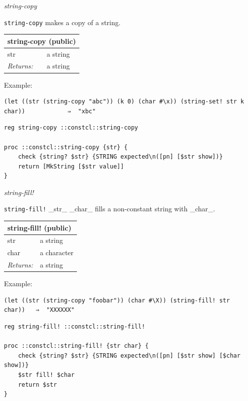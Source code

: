 \documentclass[twoside,9pt]{report}
\begin{document}
\emph{string-copy}


\texttt{string-copy} makes a copy of a string.

\begin{tabular}{ |l l| }
\hline
\multicolumn{2}{|l|}{string-copy (public)} \\
\hline
str & a string \\
\textit{Returns:} & a string \\
\hline
\end{tabular}


Example:

\noindent\makebox[\linewidth]{\rule{\linewidth}{0.4pt}}
\begin{lstlisting}
(let ((str (string-copy "abc")) (k 0) (char #\x)) (string-set! str k char))            ⇒  "xbc"
\end{lstlisting}
\noindent\makebox[\linewidth]{\rule{\linewidth}{0.4pt}}
\noindent\makebox[\linewidth]{\rule{\linewidth}{0.4pt}}
\begin{lstlisting}
reg string-copy ::constcl::string-copy
 
proc ::constcl::string-copy {str} {
    check {string? $str} {STRING expected\n([pn] [$str show])}
    return [MkString [$str value]]
}
\end{lstlisting}
\noindent\makebox[\linewidth]{\rule{\linewidth}{0.4pt}}

\emph{string-fill!}


\texttt{string-fill!} \_str\_ \_char\_ fills a non-constant string with \_char\_.

\begin{tabular}{ |l l| }
\hline
\multicolumn{2}{|l|}{string-fill! (public)} \\
\hline
str & a string \\
char & a character \\
\textit{Returns:} & a string \\
\hline
\end{tabular}


Example:

\noindent\makebox[\linewidth]{\rule{\linewidth}{0.4pt}}
\begin{lstlisting}
(let ((str (string-copy "foobar")) (char #\X)) (string-fill! str char))   ⇒  "XXXXXX"
\end{lstlisting}
\noindent\makebox[\linewidth]{\rule{\linewidth}{0.4pt}}
\noindent\makebox[\linewidth]{\rule{\linewidth}{0.4pt}}
\begin{lstlisting}
reg string-fill! ::constcl::string-fill!
 
proc ::constcl::string-fill! {str char} {
    check {string? $str} {STRING expected\n([pn] [$str show] [$char show])}
    $str fill! $char
    return $str
}
\end{lstlisting}
\noindent\makebox[\linewidth]{\rule{\linewidth}{0.4pt}}
\end{document}

